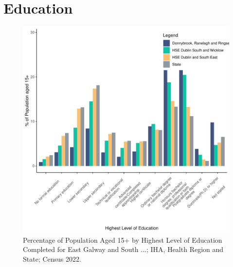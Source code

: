 \documentclass{article}
\begin{document}
\section{Education}\label{sect:Edu}
\begin{figure}[H]
	\centering
	\includegraphics[width = 120mm]{../figures/EduED.pdf}
	\caption{Percentage of Population Aged 15+ by Highest Level of Education Completed for East Galway and South ...; IHA, Health Region and State; Census 2022.}
	\label{fig:vbnv}
	\end{figure}
\end{document}
